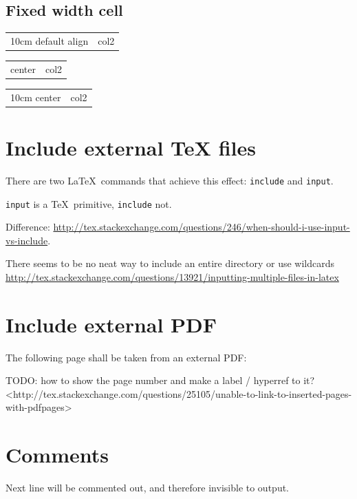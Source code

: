\documentclass[12pt]{article}
\begin{document}
\subsection{Fixed width cell}\label{fixed-width-cell}

\begin{tabular}{>{}m{10cm} | l}
10cm default align & col2
\end{tabular}

\begin{tabular}{>{\centering}m{10cm} | l}
10cm center & col2
\end{tabular}

\begin{tabular}{>{}m{10cm} | l}
10cm center & col2
\end{tabular}

\section{Include external TeX files}\label{include}

There are two \LaTeX\ commands that achieve this effect: \lstinline|include| and \lstinline|input|.

\lstinline|input| is a \TeX\ primitive, \lstinline|include| not.

Difference: \url{http://tex.stackexchange.com/questions/246/when-should-i-use-input-vs-include}.

There seems to be no neat way to include an entire directory or use wildcards \url{http://tex.stackexchange.com/questions/13921/inputting-multiple-files-in-latex}

\section{Include external PDF}\label{include-external-pdf}

The following page shall be taken from an external PDF:



TODO: how to show the page number and make a label / hyperref to it? <http://tex.stackexchange.com/questions/25105/unable-to-link-to-inserted-pages-with-pdfpages>

\section{Comments}\label{comments}

Next line will be commented out, and therefore invisible to output.

\end{document}
